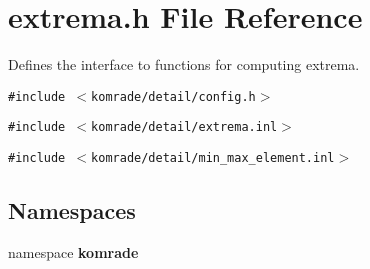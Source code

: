 \section{extrema.h File Reference}
\label{extrema_8h}
Defines the interface to functions for computing extrema. 

{\tt \#include $<$komrade/detail/config.h$>$}\par
{\tt \#include $<$komrade/detail/extrema.inl$>$}\par
{\tt \#include $<$komrade/detail/min\_\-max\_\-element.inl$>$}\par
\subsection*{Namespaces}
\begin{CompactItemize}
\item 
namespace {\bf komrade}
\end{CompactItemize}
